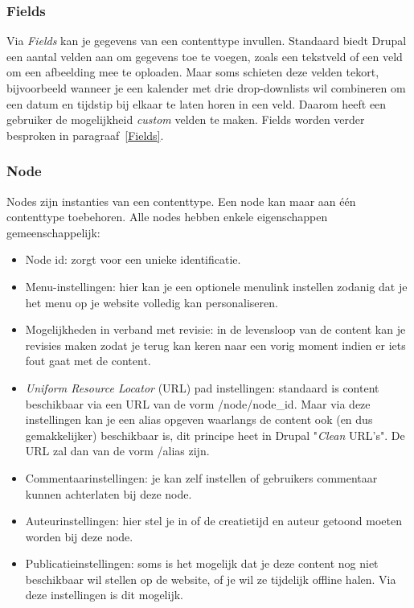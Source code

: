 \subsubsection{Fields}
Via \textit{Fields} kan je gegevens van een contenttype invullen. Standaard biedt Drupal een aantal velden aan om gegevens toe te voegen, zoals een tekstveld of een veld om een afbeelding mee te oploaden. Maar soms schieten deze velden tekort, bijvoorbeeld wanneer je een kalender met drie drop-downlists wil combineren om een datum en tijdstip bij elkaar te laten horen in een veld. Daarom heeft een gebruiker de mogelijkheid \textit{custom} velden te maken. Fields worden verder besproken in paragraaf~\ref{Fields}.

\subsubsection{Node}
Nodes zijn instanties van een contenttype. Een node kan maar aan \'{e}\'{e}n contenttype toebehoren.
Alle nodes hebben enkele eigenschappen gemeenschappelijk:
\begin{itemize}
\item Node id: zorgt voor een unieke identificatie.
\item Menu-instellingen: hier kan je een optionele menulink instellen zodanig dat je het menu op je website volledig kan personaliseren.
\item Mogelijkheden in verband met revisie: in de levensloop van de content kan je revisies maken zodat je terug kan keren naar een vorig moment indien er iets fout gaat met de content.
\item \textit{Uniform Resource Locator} (URL)  pad instellingen: standaard is content beschikbaar via een URL van de vorm /node/node\_id. Maar via deze instellingen kan je een alias opgeven waarlangs de content ook (en dus gemakkelijker) beschikbaar is, dit principe heet in Drupal "\textit{Clean} URL's". De URL zal dan van de vorm /alias zijn.
\item Commentaarinstellingen: je kan zelf instellen of gebruikers commentaar kunnen achterlaten bij deze node.
\item Auteurinstellingen: hier stel je in of de creatietijd en auteur getoond moeten worden bij deze node.
\item Publicatieinstellingen: soms is het mogelijk dat je deze content nog niet beschikbaar wil stellen op de website, of je wil ze tijdelijk offline halen. Via deze instellingen is dit mogelijk.
\end{itemize}

